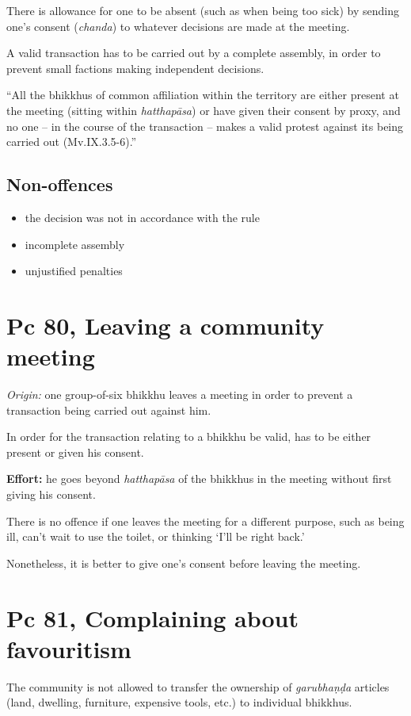 There is allowance for one to be absent (such as when being too sick) by
sending one's consent (\emph{chanda}) to whatever decisions are made at
the meeting.

A valid transaction has to be carried out by a complete assembly, in
order to prevent small factions making independent decisions.

``All the bhikkhus of common affiliation within the territory are either
present at the meeting (sitting within \emph{hatthapāsa}) or have given
their consent by proxy, and no one -- in the course of the transaction
-- makes a valid protest against its being carried out (Mv.IX.3.5-6).''

\subsection{Non-offences}

\begin{itemize}
\tightlist
\item
  the decision was not in accordance with the rule
\item
  incomplete assembly
\item
  unjustified penalties
\end{itemize}

\section{Pc 80, Leaving a community meeting}

\emph{Origin:} one group-of-six bhikkhu leaves a meeting in order to
prevent a transaction being carried out against him.

In order for the transaction relating to a bhikkhu be valid, has to be
either present or given his consent.

\textbf{Effort:} he goes beyond \emph{hatthapāsa} of the bhikkhus in the
meeting without first giving his consent.

There is no offence if one leaves the meeting for a different purpose,
such as being ill, can't wait to use the toilet, or thinking `I'll be
right back.'

Nonetheless, it is better to give one's consent before leaving the
meeting.

\section{Pc 81, Complaining about favouritism}

The community is not allowed to transfer the ownership of
\emph{garubhaṇḍa} articles (land, dwelling, furniture, expensive tools,
etc.) to individual bhikkhus.

